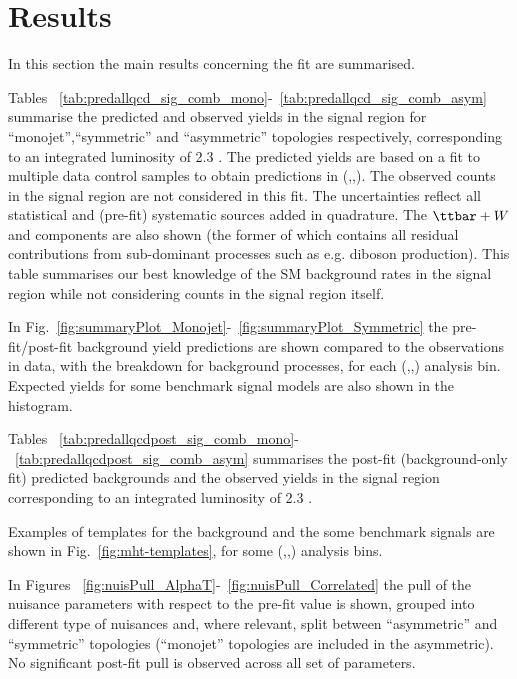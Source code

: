\section{Results}
\label{sec:results}

In this section the main results concerning the fit are summarised. 

Tables ~\ref{tab:predallqcd_sig_comb_mono}-~\ref{tab:predallqcd_sig_comb_asym} summarise 
the predicted and observed yields in the signal region 
for ``monojet'',``symmetric'' and ``asymmetric'' topologies respectively, 
corresponding to an integrated luminosity of 2.3 \ifb.
The predicted yields are based on a fit to multiple data control samples to obtain predictions in (\nj,\nb,\scalht). 
The observed counts in the signal region are not considered in this fit. 
The uncertainties reflect all statistical and (pre-fit) systematic sources added in quadrature. 
The $\ttbar+W$ and \znunu components are also shown (the former of which contains all residual contributions from sub-dominant processes such as e.g. diboson production). 
This table summarises our best knowledge of the SM background rates in the signal region while not considering counts in the signal region itself. 

In Fig.~\ref{fig:summaryPlot_Monojet}-~\ref{fig:summaryPlot_Symmetric} the pre-fit/post-fit background yield predictions 
are shown compared to the observations in data, with the breakdown for background processes, for each (\njet,\nb,\scalht) analysis bin. 
Expected yields for some benchmark signal models are also shown in the histogram. 

Tables ~\ref{tab:predallqcdpost_sig_comb_mono}-~\ref{tab:predallqcdpost_sig_comb_asym} summarises the post-fit (background-only fit) predicted backgrounds and the 
observed yields in the signal region corresponding to an integrated luminosity of 2.3 \ifb. 

Examples of \mht templates for the background and the some benchmark signals are shown in Fig.~\ref{fig:mht-templates}, 
for some (\njet,\nb,\scalht) analysis bins. 

In Figures ~\ref{fig:nuisPull_AlphaT}-~\ref{fig:nuisPull_Correlated} the pull 
of the nuisance parameters with respect to the pre-fit value is shown, 
grouped into different type of nuisances and, where relevant, 
split between ``asymmetric'' and ``symmetric'' topologies 
(``monojet'' topologies are included in the asymmetric). \\
No significant post-fit pull is observed across all set of parameters. 


